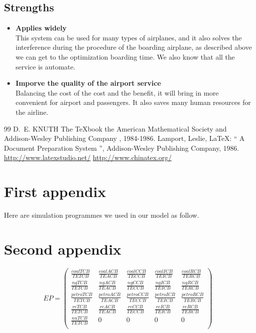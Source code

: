 \documentclass{mcmthesis}
\begin{document}
\subsection{Strengths}
\begin{itemize}
\item \textbf{Applies widely}\\
This system can be used for many types of airplanes, and it also
solves the interference during the procedure of the boarding airplane,
as described above we can get to the optimization
boarding time. We also know that all the service is automate.
\item \textbf{Imporve the quality of the airport service}\\
Balancing the cost of the cost and the benefit, it will bring in more convenient
for airport and passengers. It also saves many human resources for the airline.
\end{itemize}
\begin{thebibliography} {99}
   D.~E. KNUTH   The \TeX{}book  the American
  Mathematical Society and Addison-Wesley
  Publishing Company , 1984-1986.
  Lamport, Leslie,  \LaTeX{}: `` A Document Preparation System '',
  Addison-Wesley Publishing Company, 1986.
  \url{http://www.latexstudio.net/}
  \url{http://www.chinatex.org/}
\end{thebibliography}

\begin{appendices}
  \section{First appendix}
  Here are simulation programmes we used in our model as follow.\\
  \section{Second appendix}
\end{appendices}
$$
  EP =
  \begin{pmatrix}
  \frac{coalTCB}{TETCB} & \frac{coalACB}{TEACB} & \frac{coalCCB}{TECCB} & \frac{coalICB}{TEICB} & \frac{coalRCB}{TERCB}  \\
  \frac{ngTCB}{TETCB} & \frac{ngACB}{TEACB} & \frac{ngCCB}{TECCB} & \frac{ngICB}{TEICB} & \frac{ngRCB}{TERCB} \\
  \frac{petroTCB}{TETCB} & \frac{petroACB}{TEACB} & \frac{petroCCB}{TECCB} & \frac{petroICB}{TEICB} & \frac{petroRCB}{TERCB} \\
  \frac{reTCB}{TETCB} & \frac{reACB}{TEACB} & \frac{reCCB}{TECCB} & \frac{reICB}{TEICB} & \frac{reRCB}{TERCB} \\
  \frac{nuTCB}{TETCB} & 0 & 0 & 0 & 0\\
  \end{pmatrix}
$$
\end{document}
